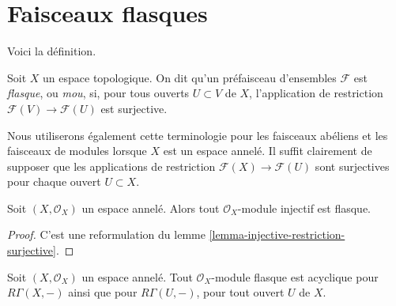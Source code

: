 \section{Faisceaux flasques}

\label{section-flasque}

\noindent
Voici la définition.

\begin{definition}

\label{definition-flasque}
Soit $X$ un espace topologique. On dit qu'un préfaisceau d'ensembles $\mathcal{F}$ est {\it flasque}, ou {\it mou}, si, pour tous ouverts $U \subset V$ de $X$, l'application de restriction $\mathcal{F}(V) \to \mathcal{F}(U)$ est surjective.
\end{definition}

\noindent
Nous utiliserons également cette terminologie pour les faisceaux abéliens et les faisceaux de modules lorsque $X$ est un espace annelé. Il suffit clairement de supposer que les applications de restriction $\mathcal{F}(X) \to \mathcal{F}(U)$ sont surjectives pour chaque ouvert $U \subset X$.

\begin{lemma}

\label{lemma-injective-flasque}
Soit $(X, \mathcal{O}_X)$ un espace annelé. Alors tout $\mathcal{O}_X$-module injectif est flasque.
\end{lemma}

\begin{proof}
C'est une reformulation du lemme \ref{lemma-injective-restriction-surjective}.
\end{proof}

\begin{lemma}

\label{lemma-flasque-acyclic}
Soit $(X, \mathcal{O}_X)$ un espace annelé. Tout $\mathcal{O}_X$-module flasque est acyclique pour $R\Gamma(X, -)$ ainsi que pour $R\Gamma(U, -)$, pour tout ouvert $U$ de $X$.
\end{lemma}

